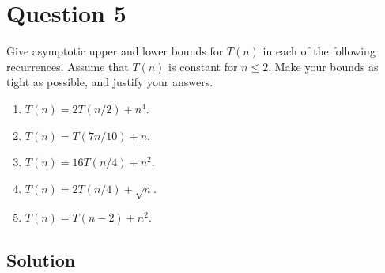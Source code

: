 
\section*{Question 5}

Give asymptotic upper and lower bounds for $T(n)$ in each of the following recurrences. Assume that $T(n)$ is constant for $n \leq 2$. Make your bounds as tight as possible, and justify your answers.

\begin{enumerate}[label=(\alph*)]
\item $T(n) = 2T(n/2) + n^4$.
\item $T(n) = T(7n/10) + n$.
\item $T(n) = 16T(n/4) + n^2$.
\item $T(n) = 2T(n/4) + \sqrt{n}$.
\item $T(n) = T(n-2) + n^2$. 
\end{enumerate}

\subsection*{Solution}

